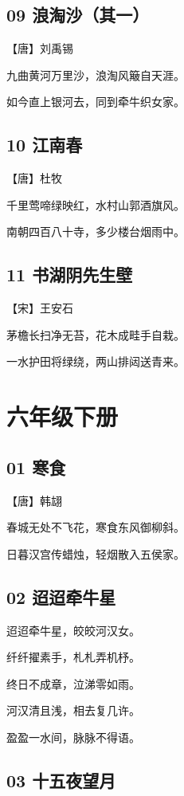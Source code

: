 \documentclass[12pt]{article}
\begin{document}
\subsection*{09 浪淘沙（其一）}

【唐】刘禹锡

九曲黄河万里沙，浪淘风簸自天涯。

如今直上银河去，同到牵牛织女家。

\subsection*{10 江南春}

【唐】杜牧

千里莺啼绿映红，水村山郭酒旗风。

南朝四百八十寺，多少楼台烟雨中。

\subsection*{11 书湖阴先生壁}

【宋】王安石

茅檐长扫净无苔，花木成畦手自栽。

一水护田将绿绕，两山排闼送青来。

\newpage

\section*{六年级下册}

\subsection*{01 寒食}

【唐】韩翃

春城无处不飞花，寒食东风御柳斜。

日暮汉宫传蜡烛，轻烟散入五侯家。

\subsection*{02 迢迢牵牛星}

迢迢牵牛星，皎皎河汉女。

纤纤擢素手，札札弄机杼。

终日不成章，泣涕零如雨。

河汉清且浅，相去复几许。

盈盈一水间，脉脉不得语。

\subsection*{03 十五夜望月}
\end{document}
